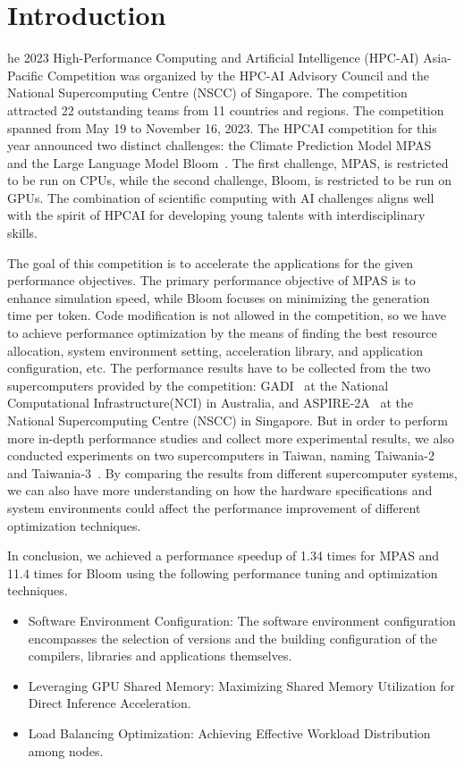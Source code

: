 \section{Introduction}
\label{sec:intro}

he 2023 High-Performance Computing and Artificial Intelligence (HPC-AI) Asia-Pacific Competition was organized by the HPC-AI Advisory Council and the National Supercomputing Centre (NSCC) of Singapore. The competition attracted 22 outstanding teams from 11 countries and regions. The competition spanned from May 19 to November 16, 2023. The HPCAI competition for this year announced two distinct challenges: the Climate Prediction Model MPAS~\cite{mpas} and the Large Language Model Bloom~\cite{Bloom-model}. The first challenge, MPAS, is restricted to be run on CPUs, while the second challenge, Bloom, is restricted to be run on GPUs. The combination of scientific computing with AI challenges aligns well with the spirit of HPCAI for developing young talents with interdisciplinary skills.

The goal of this competition is to accelerate the applications for the given performance objectives. The primary performance objective of MPAS is to enhance simulation speed, while Bloom focuses on minimizing the generation time per token. Code modification is not allowed in the competition, so we have to achieve performance optimization by the means of finding the best resource allocation, system environment setting, acceleration library, and application configuration, etc. The performance results have to be collected from the two supercomputers provided by the competition: GADI~\cite{gadi} at the
National Computational Infrastructure(NCI) in Australia, and ASPIRE-2A~\cite{aspire-2a} at the National Supercomputing Centre
(NSCC) in Singapore. But in order to perform more in-depth performance studies and collect more experimental results, we also conducted experiments on two supercomputers in Taiwan, naming Taiwania-2~\cite{taiwania} and Taiwania-3~\cite{taiwania}. By comparing the results from different supercomputer systems, we can also have more understanding on how the hardware specifications and system environments could affect the performance improvement of different optimization techniques. 

In conclusion, we achieved a performance speedup of 1.34 times for MPAS and 11.4 times for Bloom using the following performance tuning and optimization techniques.
\begin{itemize}
    \item Software Environment Configuration: The software environment configuration encompasses the selection of versions and the building configuration of the compilers, libraries and applications themselves.
    \item Leveraging GPU Shared Memory: Maximizing Shared Memory Utilization for Direct Inference Acceleration.
    \item Load Balancing Optimization: Achieving Effective Workload Distribution among nodes.
\end{itemize}


